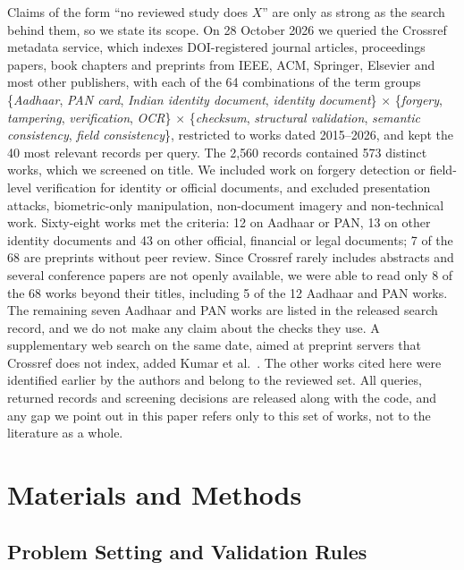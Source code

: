 \documentclass[12pt]{article}
\begin{document}
Claims of the form ``no reviewed study does $X$'' are only as strong as
the search behind them, so we state its scope. On 28 October 2026 we
queried the Crossref metadata service, which indexes DOI-registered
journal articles, proceedings papers, book chapters and preprints from
IEEE, ACM, Springer, Elsevier and most other publishers, with each of
the 64 combinations of the term groups \{\emph{Aadhaar}, \emph{PAN
card}, \emph{Indian identity document}, \emph{identity document}\}
$\times$ \{\emph{forgery}, \emph{tampering}, \emph{verification},
\emph{OCR}\} $\times$ \{\emph{checksum}, \emph{structural validation},
\emph{semantic consistency}, \emph{field consistency}\}, restricted to
works dated 2015--2026, and kept the 40 most relevant records per
query. The 2{,}560 records contained 573 distinct works, which we
screened on title. We included work on forgery detection or field-level
verification for identity or official documents, and excluded
presentation attacks, biometric-only manipulation, non-document imagery
and non-technical work. Sixty-eight works met the criteria: 12 on
Aadhaar or PAN, 13 on other identity documents and 43 on other official,
financial or legal documents; 7 of the 68 are preprints without peer
review. Since Crossref rarely includes abstracts and several conference papers are not openly available, we were able to read only 8 of the 68 works beyond their titles, including 5 of the 12 Aadhaar and PAN works. The remaining seven Aadhaar and PAN works are listed in the released search record, and we do not make any claim about the checks they use. A supplementary web search on the same date, aimed at
preprint servers that Crossref does not index, added
Kumar et al.~\cite{flid}. The other works cited here were identified
earlier by the authors and belong to the reviewed set. All queries, returned records and screening decisions are released along with the code, and any gap we point out in this paper refers only to this set of works, not to the literature as a whole.

\section{Materials and Methods}
\label{sec:methods}

\subsection{Problem Setting and Validation Rules}
\label{sec:framework}
\end{document}
